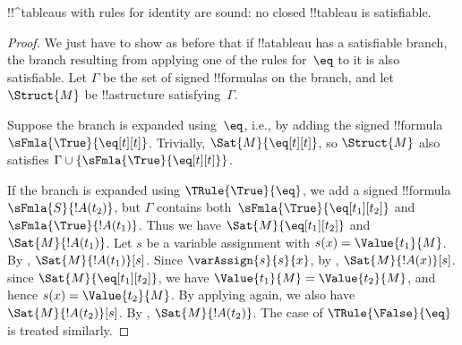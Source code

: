 \documentclass[../../../include/open-logic-section]{subfiles}
\begin{document}

\begin{prop}
!!^{tableau}s with rules for identity are sound: no closed !!{tableau}
  is satisfiable.
\end{prop}

\begin{proof}
We just have to show as before that if !!a{tableau} has a satisfiable
branch, the branch resulting from applying one of the rules for~$\eq$
to it is also satisfiable. Let $\Gamma$ be the set of signed
!!{formula}s on the branch, and let $\Struct{M}$ be !!a{structure}
satisfying~$\Gamma$.

Suppose the branch is expanded using~$\eq$, i.e., by adding the signed
!!{formula}~$\sFmla{\True}{\eq[t][t]}$. Trivially,
$\Sat{M}{\eq[t][t]}$, so $\Struct{M}$ also satisfies $\Gamma \cup
\{\sFmla{\True}{\eq[t][t]}\}$.

If the branch is expanded using $\TRule{\True}{\eq}$, we add a signed
!!{formula}~$\sFmla{S}{!A(t_2)}$, but $\Gamma$ contains
both~$\sFmla{\True}{\eq[t_1][t_2]}$ and $\sFmla{\True}{!A(t_1)}$. Thus
we have $\Sat{M}{\eq[t_1][t_2]}$ and $\Sat{M}{!A(t_1)}$. Let $s$ be a
variable assignment with $s(x) = \Value{t_1}{M}$.  By
, $\Sat{M}{!A(t_1)}[s]$. Since
$\varAssign{s}{s}{x}$, by ,
$\Sat{M}{!A(x)}[s]$. since $\Sat{M}{\eq[t_1][t_2]}$, we have
$\Value{t_1}{M} = \Value{t_2}{M}$, and hence $s(x) = \Value{t_2}{M}$.
By applying  again, we also have
$\Sat{M}{!A(t_2)}[s]$.  By ,
$\Sat{M}{!A(t_2)}$. The case of $\TRule{\False}{\eq}$ is treated
similarly.
\end{proof}
\end{document}
